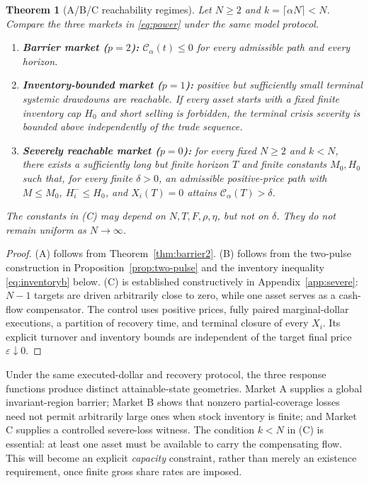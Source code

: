 \documentclass[11pt]{article}
\numberwithin{equation}{section}
\newtheorem{theorem}{Theorem}[section]
\theoremstyle{definition}
\theoremstyle{remark}
\newcommand{\Cris}{\mathcal{C}}
\begin{document}
\begin{theorem}[A/B/C reachability regimes]\label{thm:ABC}
Let $N\ge2$ and $k=\lceil\alpha N\rceil<N$. Compare the three markets in \eqref{eq:power} under the same model protocol.
\begin{enumerate}[label=\textup{(\Alph*)},leftmargin=2em,itemsep=0.15em]
\item \textbf{Barrier market ($p=2$):} $\Cris_\alpha(t)\le0$ for every admissible path and every horizon.
\item \textbf{Inventory-bounded market ($p=1$):} positive but sufficiently small terminal systemic drawdowns are reachable. If every asset starts with a fixed finite inventory cap $H_0$ and short selling is forbidden, the terminal crisis severity is bounded above independently of the trade sequence.
\item \textbf{Severely reachable market ($p=0$):} for every fixed $N\ge2$ and $k<N$, there exists a sufficiently long but finite horizon $T$ and finite constants $M_0,H_0$ such that, for \emph{every} finite $\delta>0$, an admissible positive-price path with $M\le M_0$, $H_i^-\le H_0$, and $X_i(T)=0$ attains $\Cris_\alpha(T)>\delta$.
\end{enumerate}
The constants in (C) may depend on $N,T,F,\rho,\eta$, but not on $\delta$. They do not remain uniform as $N\to\infty$.
\end{theorem}
\begin{proof}
(A) follows from Theorem~\ref{thm:barrier2}. (B) follows from the two-pulse construction in Proposition~\ref{prop:two-pulse} and the inventory inequality \eqref{eq:inventoryb} below. (C) is established constructively in Appendix~\ref{app:severe}: $N-1$ targets are driven arbitrarily close to zero, while one asset serves as a cash-flow compensator. The control uses positive prices, fully paired marginal-dollar executions, a partition of recovery time, and terminal closure of every $X_i$. Its explicit turnover and inventory bounds are independent of the target final price $\varepsilon\downarrow0$.
\end{proof}

Under the same executed-dollar and recovery protocol, the three response functions produce distinct attainable-state geometries. Market A supplies a global invariant-region barrier; Market B shows that nonzero partial-coverage losses need not permit arbitrarily large ones when stock inventory is finite; and Market C supplies a controlled severe-loss witness. The condition $k<N$ in (C) is essential: at least one asset must be available to carry the compensating flow. This will become an explicit \emph{capacity} constraint, rather than merely an existence requirement, once finite gross share rates are imposed.
\end{document}
